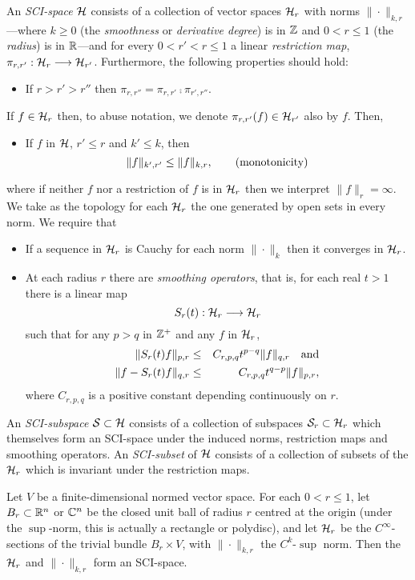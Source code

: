 \documentclass{article}
\begin{document}
\begin{defn}
An \emph{SCI-space} $\mathcal H$ consists of a collection of vector spaces $\mathcal{H}_r$ with norms $\|\cdot\|_{k,r}$---where $k\geq0$ (the \emph{smoothness} or \emph{derivative degree}) is in $\mathbb Z$ and $0<r\leq1$ (the \emph{radius}) is in $\mathbb R$---and for every $0<r'<r\leq1$ a linear \emph{restriction map}, $\pi_{r,r'} : \mathcal H_r \longrightarrow \mathcal H_{r'}$.  Furthermore, the following properties should hold:
\begin{itemize}
\item If $r>r'>r''$ then $\pi_{r,r''}=\pi_{r,r'}\comp\pi_{r',r''}$.
\end{itemize}
If $f \in \mathcal{H}_r$ then, to abuse notation, we denote $\pi_{r,r'}(f) \in \mathcal H_{r'}$ also by $f$. Then,
\begin{itemize}
\item If $f$ in $\mathcal{H}$, $r'\leq r$ and $k'\leq k$, then
$$\|f\|_{k',r'} \leq \|f\|_{k,r}, \qquad \textnormal{(monotonicity)}$$
\end{itemize}
where if neither $f$ nor a restriction of $f$ is in $\mathcal H_r$ then we interpret $\|f\|_r = \infty$.  We take as the topology for each $\mathcal{H}_r$ the one generated by open sets in every norm.  We require that
\begin{itemize}
\item If a sequence in $\mathcal{H}_r$ is Cauchy for each norm $\|\cdot\|_k$ then it converges in $\mathcal{H}_r$.
\item At each radius $r$ there are \emph{smoothing operators}, that is, for each real $t>1$ there is a linear map
$$S_r(t) : \mathcal H_r \longrightarrow \mathcal H_r$$
such that for any $p>q$ in $\mathbb Z^+$ and any $f$ in $\mathcal H_r$,
\begin{eqnarray}
\|S_r(t)f\|_{p,r} &\leq& C_{r,p,q} t^{p-q}\|f\|_{q,r} \quad\textnormal{and} \\
\|f-S_r(t)f\|_{q,r} &\leq& C_{r,p,q} t^{q-p}\|f\|_{p,r},
\end{eqnarray}
where $C_{r,p,q}$ is a positive constant depending continuously on $r$.
\end{itemize}


An \emph{SCI-subspace} $\mathcal S \subset \mathcal H$ consists of a collection of subspaces $\mathcal S_r \subset \mathcal H_r$ which themselves form an SCI-space under the induced norms, restriction maps and smoothing operators.  An \emph{SCI-subset} of $\mathcal H$ consists of a collection of subsets of the $\mathcal H_r$ which is invariant under the restriction maps. 
\end{defn}

\begin{example}\label{sections are SCI}
Let $V$ be a finite-dimensional normed vector space.  For each $0<r\leq1$, let $B_r \subset \mathbb R^n$ or $\mathbb C^n$ be the closed unit ball of radius $r$ centred at the origin (under the $\sup$-norm, this is actually a rectangle or polydisc), and let $\mathcal H_r$ be the $C^\infty$-sections of the trivial bundle $B_r \times V$, with $\|\cdot\|_{k,r}$ the $C^k$-$\sup$ norm.  Then the $\mathcal H_r$ and $\|\cdot\|_{k,r}$ form an SCI-space.
\end{example}
\end{document}
